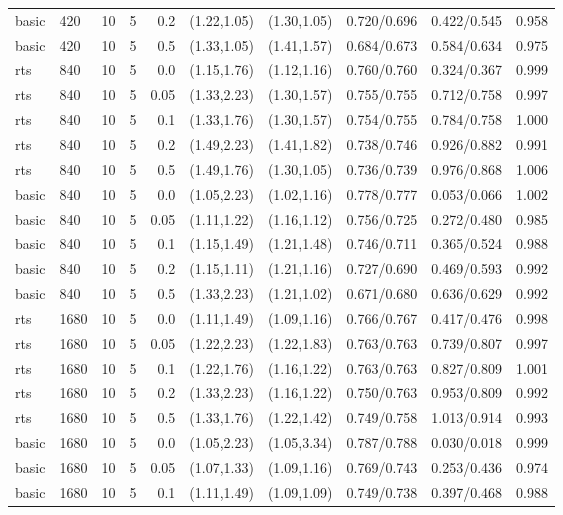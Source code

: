 \begin{tabular}{llrrrccccc}
basic & 420 & 10 & 5 & 0.2 & (1.22,1.05) & (1.30,1.05) & 0.720/0.696 & 0.422/0.545 & 0.958 \\
basic & 420 & 10 & 5 & 0.5 & (1.33,1.05) & (1.41,1.57) & 0.684/0.673 & 0.584/0.634 & 0.975 \\
rts & 840 & 10 & 5 & 0.0 & (1.15,1.76) & (1.12,1.16) & 0.760/0.760 & 0.324/0.367 & 0.999 \\
rts & 840 & 10 & 5 & 0.05 & (1.33,2.23) & (1.30,1.57) & 0.755/0.755 & 0.712/0.758 & 0.997 \\
rts & 840 & 10 & 5 & 0.1 & (1.33,1.76) & (1.30,1.57) & 0.754/0.755 & 0.784/0.758 & 1.000 \\
rts & 840 & 10 & 5 & 0.2 & (1.49,2.23) & (1.41,1.82) & 0.738/0.746 & 0.926/0.882 & 0.991 \\
rts & 840 & 10 & 5 & 0.5 & (1.49,1.76) & (1.30,1.05) & 0.736/0.739 & 0.976/0.868 & 1.006 \\
basic & 840 & 10 & 5 & 0.0 & (1.05,2.23) & (1.02,1.16) & 0.778/0.777 & 0.053/0.066 & 1.002 \\
basic & 840 & 10 & 5 & 0.05 & (1.11,1.22) & (1.16,1.12) & 0.756/0.725 & 0.272/0.480 & 0.985 \\
basic & 840 & 10 & 5 & 0.1 & (1.15,1.49) & (1.21,1.48) & 0.746/0.711 & 0.365/0.524 & 0.988 \\
basic & 840 & 10 & 5 & 0.2 & (1.15,1.11) & (1.21,1.16) & 0.727/0.690 & 0.469/0.593 & 0.992 \\
basic & 840 & 10 & 5 & 0.5 & (1.33,2.23) & (1.21,1.02) & 0.671/0.680 & 0.636/0.629 & 0.992 \\
rts & 1680 & 10 & 5 & 0.0 & (1.11,1.49) & (1.09,1.16) & 0.766/0.767 & 0.417/0.476 & 0.998 \\
rts & 1680 & 10 & 5 & 0.05 & (1.22,2.23) & (1.22,1.83) & 0.763/0.763 & 0.739/0.807 & 0.997 \\
rts & 1680 & 10 & 5 & 0.1 & (1.22,1.76) & (1.16,1.22) & 0.763/0.763 & 0.827/0.809 & 1.001 \\
rts & 1680 & 10 & 5 & 0.2 & (1.33,2.23) & (1.16,1.22) & 0.750/0.763 & 0.953/0.809 & 0.992 \\
rts & 1680 & 10 & 5 & 0.5 & (1.33,1.76) & (1.22,1.42) & 0.749/0.758 & 1.013/0.914 & 0.993 \\
basic & 1680 & 10 & 5 & 0.0 & (1.05,2.23) & (1.05,3.34) & 0.787/0.788 & 0.030/0.018 & 0.999 \\
basic & 1680 & 10 & 5 & 0.05 & (1.07,1.33) & (1.09,1.16) & 0.769/0.743 & 0.253/0.436 & 0.974 \\
basic & 1680 & 10 & 5 & 0.1 & (1.11,1.49) & (1.09,1.09) & 0.749/0.738 & 0.397/0.468 & 0.988 \\

\end{tabular}

